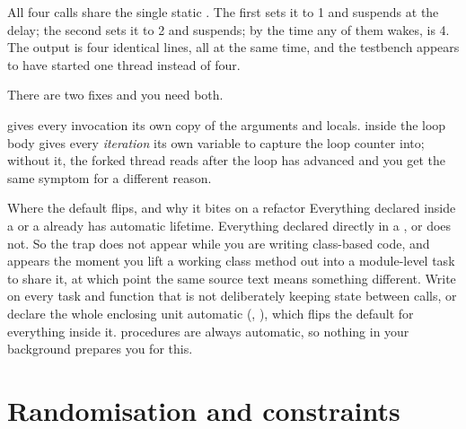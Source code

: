 All four calls share the single static . The first sets it to 1 and
suspends at the delay; the second sets it to 2 and suspends; by the time any
of them wakes,  is 4. The output is four identical lines, all at the
same time, and the testbench appears to have started one thread instead of
four.

There are two fixes and you need both.


 gives every invocation its own copy of the arguments and
locals.  inside the loop body gives every
\emph{iteration} its own variable to capture the loop counter into; without
it, the forked thread reads  after the loop has advanced and you get
the same symptom for a different reason.

\begin{gotcha}{Where the default flips, and why it bites on a refactor}
Everything declared inside a  or a  already has
automatic lifetime. Everything declared directly in a ,
 or  does not. So the trap does not appear while you
are writing class-based code, and appears the moment you lift a working class
method out into a module-level task to share it, at which point the same
source text means something different. Write  on every task and
function that is not deliberately keeping state between calls, or declare the
whole enclosing unit automatic (,
), which flips the default for everything inside
it. \VHDL{} procedures are always automatic, so nothing in your background
prepares you for this.
\end{gotcha}

\section{Randomisation and constraints}
\label{sec:beyond:random}
\label{sec:toolkit:random}

